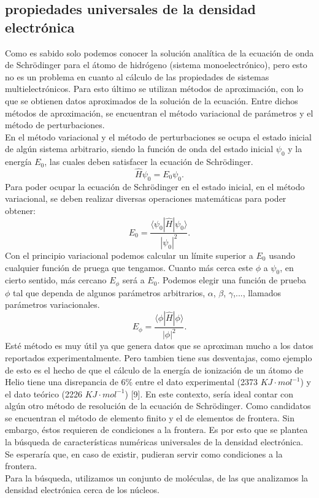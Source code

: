 \documentclass[12pt,letterpaper]{article}
\begin{document}
\subsection{propiedades universales de la densidad electrónica}
Como es sabido solo podemos conocer la solución analítica de la ecuación de onda de Schrödinger para el átomo de hidrógeno (sistema monoelectrónico),  pero esto no es un problema en cuanto al cálculo de las propiedades de sistemas multielectrónicos. Para esto último se utilizan métodos de aproximación, con lo que se obtienen datos aproximados de la solución de la ecuación. Entre dichos métodos de aproximación, se encuentran el método variacional de parámetros y el método de perturbaciones.\\
En el método variacional y el método de perturbaciones se ocupa el estado inicial de algún sistema arbitrario, siendo la función de onda del estado inicial $\psi_{0}$ y la energía $E_{0}$, las cuales deben satisfacer la ecuación de Schrödinger.\\
\begin{equation}
 \hat{H}\psi_{0}=E_{0}\psi_{0}.
\end{equation}
Para poder ocupar la ecuación de Schrödinger en el estado inicial, en el método variacional, se deben realizar diversas operaciones matemáticas para poder obtener:
 \begin{equation}
  E_{0}=\frac{\langle \psi_{0}|\hat{H}|\psi_{0} \rangle}{|\psi_{0}|^{2}}.
 \end{equation}
Con el principio variacional podemos calcular un límite superior a $E_{0}$ usando cualquier función de pruega que tengamos. Cuanto más cerca este $\phi$ a $\psi_{0}$, en cierto sentido, más cercano $E_{\phi}$ será a $E_{0}$. Podemos elegir una función de prueba $\phi$ tal que dependa de algunos parámetros arbitrarios, $\alpha$, $\beta$, $\gamma$,..., llamados parámetros variacionales.\\
\begin{equation}
 E_{\phi}=\frac{\langle\phi|\hat{H}|\phi\rangle}{|\phi|^{2}}.
\end{equation}
Esté método es muy útil ya que genera datos que se aproximan mucho a los datos reportados experimentalmente. Pero tambien tiene sus desventajas, como ejemplo de esto es el hecho de que el cálculo de la energía de ionización de un átomo de Helio tiene una disrepancia de 6\% entre el dato experimental (2373 $KJ\cdot mol^{-1}$) y el dato teórico (2226 $KJ\cdot mol^{-1}$) [9]. En este contexto, sería ideal contar con algún otro método de resolución de la ecuación de Schrödinger. Como candidatos se encuentran el método de elemento finito y el de elementos de frontera. Sin embargo, éstos requieren de condiciones a la frontera. Es por esto que se plantea la búsqueda de características numéricas universales de la densidad electrónica. Se esperaría que, en caso de existir, pudieran servir como condiciones a la frontera.\\
Para la búsqueda, utilizamos un conjunto de moléculas, de las que analizamos la densidad electrónica cerca de los núcleos.
\end{document}
